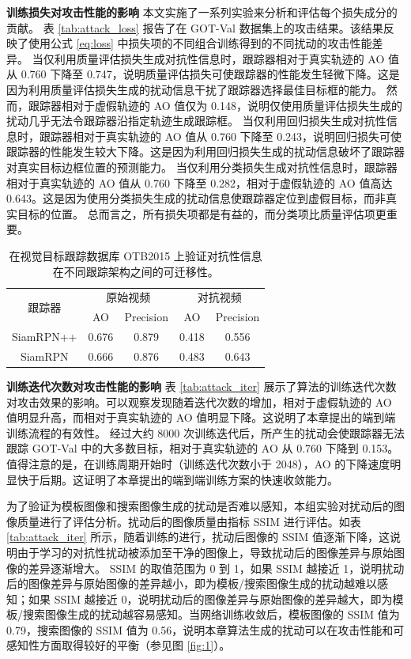 \textbf{训练损失对攻击性能的影响} 本文实施了一系列实验来分析和评估每个损失成分的贡献。
表 \ref{tab:attack_loss} 报告了在 GOT-Val 数据集上的攻击结果。该结果反映了使用公式 \ref{eq:loss} 中损失项的不同组合训练得到的不同扰动的攻击性能差异。
当仅利用质量评估损失生成对抗性信息时，跟踪器相对于真实轨迹的 AO 值从 0.760 下降至 0.747，说明质量评估损失可使跟踪器的性能发生轻微下降。这是因为利用质量评估损失生成的扰动信息干扰了跟踪器选择最佳目标框的能力。
然而，跟踪器相对于虚假轨迹的 AO 值仅为 0.148，说明仅使用质量评估损失生成的扰动几乎无法令跟踪器沿指定轨迹生成跟踪框。
当仅利用回归损失生成对抗性信息时，跟踪器相对于真实轨迹的 AO 值从 0.760 下降至 0.243，说明回归损失可使跟踪器的性能发生较大下降。这是因为利用回归损失生成的扰动信息破坏了跟踪器对真实目标边框位置的预测能力。
当仅利用分类损失生成对抗性信息时，跟踪器相对于真实轨迹的 AO 值从 0.760 下降至 0.282，相对于虚假轨迹的 AO 值高达 0.643。这是因为使用分类损失生成的扰动信息使跟踪器定位到虚假目标，而非真实目标的位置。
总而言之，所有损失项都是有益的，而分类项比质量评估项更重要。

\begin{table}[t]
\caption{在视觉目标跟踪数据库 OTB2015 上验证对抗性信息在不同跟踪架构之间的可迁移性。}
\centering
\begin{tabular}{ccccc} 
\toprule
\multirow{2}{*}[-2pt]{跟踪器} & \multicolumn{2}{c}{原始视频} & \multicolumn{2}{c}{对抗视频}  \\
\cmidrule(lr){2-3} \cmidrule(lr){4-5}
                          & AO & Precision              & AO & Precision                   \\
\midrule
SiamRPN++ \cite{SiamRPN++} & 0.676 & 0.879 & 0.418 & 0.556 \\
SiamRPN \cite{SiamRPN}     & 0.666 & 0.876 & 0.483 & 0.643 \\
\bottomrule
\end{tabular}
\label{tab:arch}
\end{table}

\textbf{训练迭代次数对攻击性能的影响} 表 \ref{tab:attack_iter} 展示了算法的训练迭代次数对攻击效果的影响。可以观察发现随着迭代次数的增加，相对于虚假轨迹的 AO 值明显升高，而相对于真实轨迹的 AO 值明显下降。这说明了本章提出的端到端训练流程的有效性。
经过大约 8000 次训练迭代后，所产生的扰动会使跟踪器无法跟踪 GOT-Val 中的大多数目标，相对于真实轨迹的 AO 从 0.760 下降到 0.153。
值得注意的是，在训练周期开始时（训练迭代次数小于 2048），AO 的下降速度明显快于后期。这证明了本章提出的端到端训练方案的快速收敛能力。

为了验证为模板图像和搜索图像生成的扰动是否难以感知，本组实验对扰动后的图像质量进行了评估分析。扰动后的图像质量由指标 SSIM 进行评估。如表 \ref{tab:attack_iter} 所示，随着训练的进行，扰动后图像的 SSIM 值逐渐下降，这说明由于学习的对抗性扰动被添加至干净的图像上，导致扰动后的图像差异与原始图像的差异逐渐增大。
SSIM 的取值范围为 0 到 1，如果 SSIM 越接近 1，说明扰动后的图像差异与原始图像的差异越小，即为模板/搜索图像生成的扰动越难以感知；如果 SSIM 越接近 0，说明扰动后的图像差异与原始图像的差异越大，即为模板/搜索图像生成的扰动越容易感知。当网络训练收敛后，模板图像的 SSIM 值为 0.79，搜索图像的 SSIM 值为 0.56，说明本章算法生成的扰动可以在攻击性能和可感知性方面取得较好的平衡（参见图 \ref{fig:1}）。

